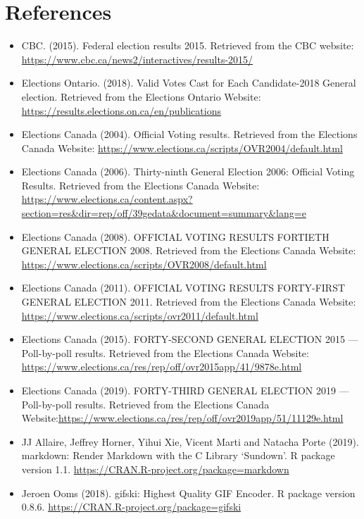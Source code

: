 \documentclass[
]{article}
\begin{document}
\hypertarget{references}{%
\section{References}\label{references}}

\begin{itemize}
\item
  CBC. (2015). Federal election results 2015. Retrieved from the CBC
  website: \url{https://www.cbc.ca/news2/interactives/results-2015/}
\item
  Elections Ontario. (2018). Valid Votes Cast for Each Candidate-2018
  General election. Retrieved from the Elections Ontario Website:
  \url{https://results.elections.on.ca/en/publications}
\item
  Elections Canada (2004). Official Voting results. Retrieved from the
  Elections Canada Website:
  \url{https://www.elections.ca/scripts/OVR2004/default.html}
\item
  Elections Canada (2006). Thirty-ninth General Election 2006: Official
  Voting Results. Retrieved from the Elections Canada Website:
  \url{https://www.elections.ca/content.aspx?section=res\&dir=rep/off/39gedata\&document=summary\&lang=e}
\item
  Elections Canada (2008). OFFICIAL VOTING RESULTS FORTIETH GENERAL
  ELECTION 2008. Retrieved from the Elections Canada Website:
  \url{https://www.elections.ca/scripts/OVR2008/default.html}
\item
  Elections Canada (2011). OFFICIAL VOTING RESULTS FORTY-FIRST GENERAL
  ELECTION 2011. Retrieved from the Elections Canada Website:
  \url{https://www.elections.ca/scripts/ovr2011/default.html}
\item
  Elections Canada (2015). FORTY-SECOND GENERAL ELECTION 2015 ---
  Poll-by-poll results. Retrieved from the Elections Canada Website:
  \url{https://www.elections.ca/res/rep/off/ovr2015app/41/9878e.html}
\item
  Elections Canada (2019). FORTY-THIRD GENERAL ELECTION 2019 ---
  Poll-by-poll results. Retrieved from the Elections Canada
  Website:\url{https://www.elections.ca/res/rep/off/ovr2019app/51/11129e.html}
\item
  JJ Allaire, Jeffrey Horner, Yihui Xie, Vicent Marti and Natacha Porte
  (2019). markdown: Render Markdown with the C Library `Sundown'. R
  package version 1.1. \url{https://CRAN.R-project.org/package=markdown}
\item
  Jeroen Ooms (2018). gifski: Highest Quality GIF Encoder. R package
  version 0.8.6. \url{https://CRAN.R-project.org/package=gifski}

\end{itemize}
\end{document}
